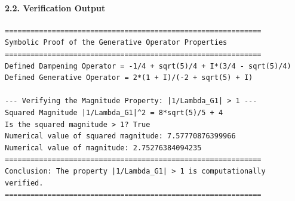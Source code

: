 \paragraph{2.2. Verification Output}
\begin{verbatim}
============================================================
Symbolic Proof of the Generative Operator Properties
============================================================
Defined Dampening Operator = -1/4 + sqrt(5)/4 + I*(3/4 - sqrt(5)/4)
Defined Generative Operator = 2*(1 + I)/(-2 + sqrt(5) + I)

--- Verifying the Magnitude Property: |1/Lambda_G1| > 1 ---
Squared Magnitude |1/Lambda_G1|^2 = 8*sqrt(5)/5 + 4
Is the squared magnitude > 1? True
Numerical value of squared magnitude: 7.57770876399966
Numerical value of magnitude: 2.75276384094235
============================================================
Conclusion: The property |1/Lambda_G1| > 1 is computationally verified.
============================================================
\end{verbatim}
\newpage